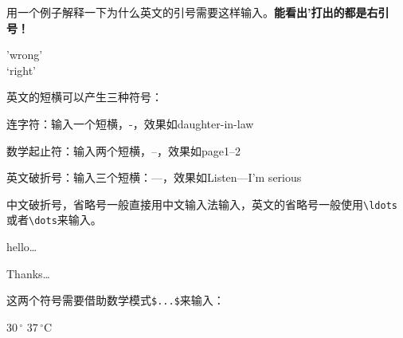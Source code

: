 用一个例子解释一下为什么英文的引号需要这样输入。\textbf{能看出'打出的都是右引号！}


\begin{codeshow}
'wrong'\\
`right'
\end{codeshow}


英文的短横可以产生三种符号：

\begin{compactitem}[\textbullet]
    \item 连字符：输入一个短横，-，效果如daughter-in-law
    \item 数学起止符：输入两个短横，--，效果如page1--2
    \item 英文破折号：输入三个短横：---，效果如Listen---I'm serious
\end{compactitem}

中文破折号，省略号一般直接用中文输入法输入，英文的省略号一般使用\lstinline|\ldots|或者\lstinline|\dots|来输入。

\begin{codeshow}
hello\ldots\par
Thanks\dots
\end{codeshow}

这两个符号需要借助数学模式\lstinline|$...$|来输入：
\begin{codeshow}
$30\,^{\circ}$
$37\,^{\circ}\mathrm{C}$
\end{codeshow}
